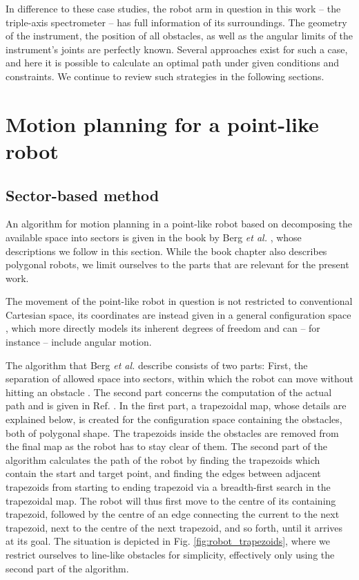 In difference to these case studies, the robot arm in question in this work --
the triple-axis spectrometer -- has full information of its surroundings.
The geometry of the instrument, the position of all obstacles, as well
as the angular limits of the instrument's joints are perfectly known.
Several approaches exist for such a case, and here it is possible to calculate
an optimal path under given conditions and constraints.
We continue to review such strategies in the following sections.



\section{Motion planning for a point-like robot}
\label{sec:pointrobot}

\subsection{Sector-based method}
\label{sec:pointrobot_sector}
An algorithm for motion planning in a point-like robot based on decomposing the 
available space into sectors is given in the book by Berg \textit{et al.}
\cite[Ch. 13, pp. 283-306]{Berg2008}, whose descriptions we follow in this section. 
While the book chapter also describes polygonal robots, we limit ourselves to the 
parts that are relevant for the present work.

The movement of the point-like robot in question is not restricted to conventional 
Cartesian space, its coordinates are instead given in a general configuration space
\cite[Ch. 13.1, pp. 284-286]{Berg2008} \cite{Choset2010_ch3}, which more directly 
models its inherent degrees of freedom and can -- for instance -- include angular motion.

The algorithm that Berg \textit{et al.} describe consists of two parts: 
First, the separation of allowed space into sectors, within which the robot can 
move without hitting an obstacle \cite[p. 286]{Berg2008}. 
The second part concerns the computation of the actual path and is given in 
Ref. \cite[p. 289]{Berg2008}. 
In the first part, a trapezoidal map, whose details are explained below, is created for the 
configuration space containing the obstacles, both of polygonal shape. 
The trapezoids inside the obstacles are removed from the final map as the robot 
has to stay clear of them. 
The second part of the algorithm calculates the path of the robot by finding 
the trapezoids which contain the start and target point, and finding the edges 
between adjacent trapezoids from starting to ending trapezoid via a breadth-first 
search in the trapezoidal map. The robot will thus first move to the centre of 
its containing trapezoid, followed by the centre of an edge connecting the current 
to the next trapezoid, next to the centre of the next trapezoid, and so forth, 
until it arrives at its goal. 
The situation is depicted in Fig. \ref{fig:robot_trapezoids}, where we restrict 
ourselves to line-like obstacles for simplicity, effectively only using the 
second part of the algorithm.

